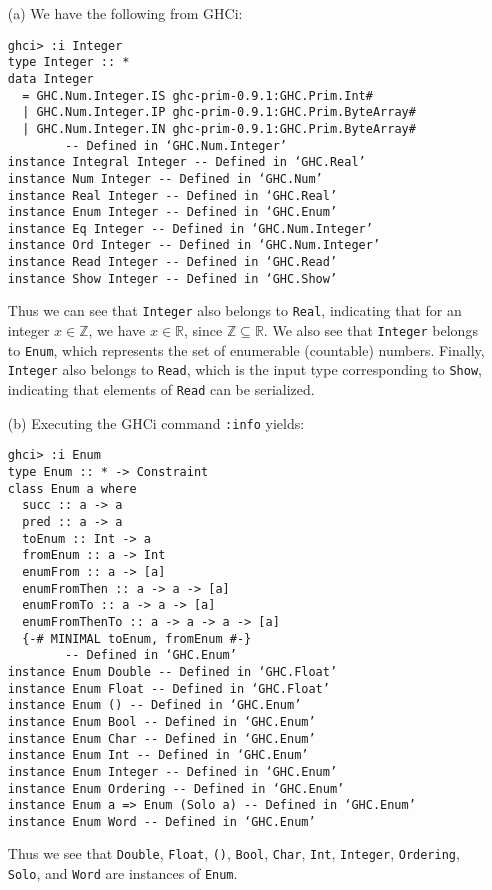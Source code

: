 
\begin{itemize}
    \item[(a)] We have the following from GHCi:
        \scriptsize\begin{verbatim}
ghci> :i Integer
type Integer :: *
data Integer
  = GHC.Num.Integer.IS ghc-prim-0.9.1:GHC.Prim.Int#
  | GHC.Num.Integer.IP ghc-prim-0.9.1:GHC.Prim.ByteArray#
  | GHC.Num.Integer.IN ghc-prim-0.9.1:GHC.Prim.ByteArray#
        -- Defined in ‘GHC.Num.Integer’
instance Integral Integer -- Defined in ‘GHC.Real’
instance Num Integer -- Defined in ‘GHC.Num’
instance Real Integer -- Defined in ‘GHC.Real’
instance Enum Integer -- Defined in ‘GHC.Enum’
instance Eq Integer -- Defined in ‘GHC.Num.Integer’
instance Ord Integer -- Defined in ‘GHC.Num.Integer’
instance Read Integer -- Defined in ‘GHC.Read’
instance Show Integer -- Defined in ‘GHC.Show’
        \end{verbatim}\normalsize
        Thus we can see that \verb|Integer| also belongs to \verb|Real|,
        indicating that for an integer $x \in \mathbb{Z}$, we have $x \in \mathbb{R}$, 
        since $\mathbb{Z} \subseteq \mathbb{R}$. We also see that \verb|Integer|
        belongs to \verb|Enum|, which represents the set of enumerable (countable) 
        numbers. Finally, \verb|Integer| also belongs to \verb|Read|, which is the
        input type corresponding to \verb|Show|, indicating that elements of 
        \verb|Read| can be serialized.
    \item[(b)] Executing the GHCi command \verb|:info| yields:
        \scriptsize\begin{verbatim}
ghci> :i Enum
type Enum :: * -> Constraint
class Enum a where
  succ :: a -> a
  pred :: a -> a
  toEnum :: Int -> a
  fromEnum :: a -> Int
  enumFrom :: a -> [a]
  enumFromThen :: a -> a -> [a]
  enumFromTo :: a -> a -> [a]
  enumFromThenTo :: a -> a -> a -> [a]
  {-# MINIMAL toEnum, fromEnum #-}
        -- Defined in ‘GHC.Enum’
instance Enum Double -- Defined in ‘GHC.Float’
instance Enum Float -- Defined in ‘GHC.Float’
instance Enum () -- Defined in ‘GHC.Enum’
instance Enum Bool -- Defined in ‘GHC.Enum’
instance Enum Char -- Defined in ‘GHC.Enum’
instance Enum Int -- Defined in ‘GHC.Enum’
instance Enum Integer -- Defined in ‘GHC.Enum’
instance Enum Ordering -- Defined in ‘GHC.Enum’
instance Enum a => Enum (Solo a) -- Defined in ‘GHC.Enum’
instance Enum Word -- Defined in ‘GHC.Enum’
        \end{verbatim}\normalsize
        Thus we see that \verb|Double|, \verb|Float|, \verb|()|, \verb|Bool|, 
        \verb|Char|, \verb|Int|, \verb|Integer|, \verb|Ordering|, \verb|Solo|,
        and \verb|Word| are instances of \verb|Enum|.
\end{itemize}
